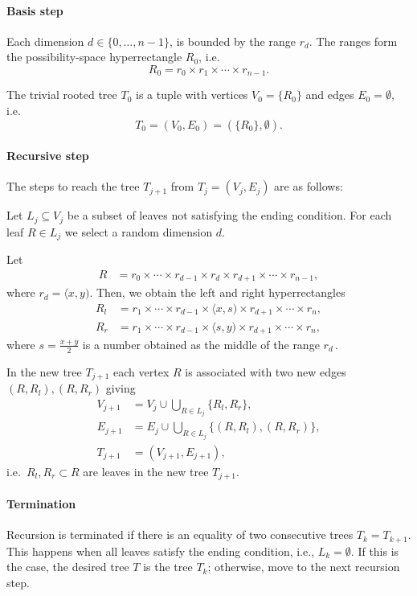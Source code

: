 \paragraph{Basis step}
Each dimension \(d \in\{0, \dots, n-1\}\), is bounded by the range \(r_d\). The ranges form the possibility-space hyperrectangle \(R_0\), i.e.
\[R_0 =  r_0 \times r_1 \times \cdots \times r_{n-1}.\]

The trivial rooted tree \(T_0\) is a tuple with
vertices \(V_0 = \{R_0\}\) and edges \(E_0 = \emptyset\), i.e.
\[T_0= (V_0, E_0) = (\{R_0\},\emptyset).\]

\paragraph{Recursive step}
The steps to reach the tree \(T_{j+1}\) from \(T_{j} = (V_j, E_j)\) are
as follows:

Let \(L_j \subseteq V_j\) be a subset of leaves not satisfying the
ending condition.
For each leaf \(R \in L_j\) we
select a random dimension \(d\).

Let
\begin{align*}
R &= r_0 \times  \cdots \times r_{d-1} \times  r_d\times r_{d+1} \times \cdots \times r_{n-1},
\end{align*}
where $r_d = \langle x, y )$.
Then, we obtain the left and right hyperrectangles
\begin{align*}
R_l &= r_1 \times  \cdots \times r_{d-1} \times  \langle x, s ) \times r_{d+1} \times \cdots \times r_n, \\
R_r &= r_1 \times  \cdots \times r_{d-1} \times \langle s, y ) \times r_{d+1} \times \cdots \times r_n,
\end{align*}
where \(s = \frac{x + y}{2}\) is a number obtained as the middle of the range \(r_d\,\).

In the new tree $T_{j+1}$ each vertex \(R\) is associated with two new
edges \((R,R_l ), (R, R_r)\) giving
\begin{align*}
V_{j+1} &= V_j \cup \bigcup_{R \in L_j} \{R_l, R_r\},\\
E_{j+1} &= E_j \cup \bigcup_{R \in L_j} \{(R, R_l), (R,R_r)\},\\
T_{j+1} &= (V_{j+1}, E_{j+1}),
\end{align*}
i.e.~${R_l, R_r} \subset R$ are leaves in the new tree
\(T_{j+1}\).

\paragraph{Termination} Recursion is terminated if there is an equality of two consecutive trees \(T_k = T_{k+1}\). This happens when all leaves satisfy the ending condition, i.e., \(L_k = \emptyset\).
If this is the case, the desired tree $T$ is the tree $T_k$; otherwise, move to the next recursion step.


